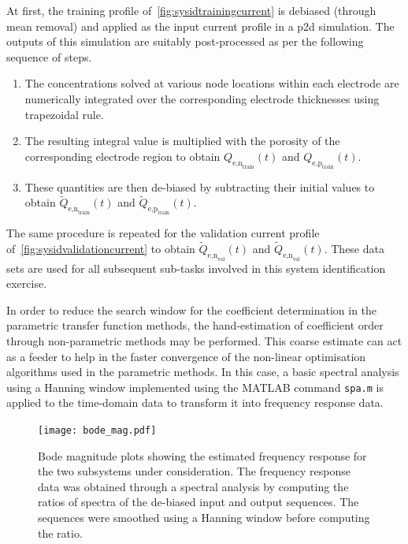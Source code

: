 At first, the training profile of~\cref{fig:sysidtrainingcurrent} is
debiased (through mean removal) and applied as the input current profile in a \gls{p2d}
simulation. The outputs of this simulation are suitably post-processed as per
the following sequence of steps.
\begin{enumerate}
    \item The concentrations solved at various node locations within each
        electrode are numerically integrated over the corresponding electrode
        thicknesses using trapezoidal rule.
    \item The resulting integral value is multiplied with the porosity of the
        corresponding electrode region to obtain $Q_{\text{e,n}_\text{train}}(t)$ and
        $Q_{\text{e,p}_\text{train}}(t)$.
    \item These quantities are then de-biased by subtracting their initial
        values to obtain $\widetilde{Q}_{\text{e,n}_\text{train}}(t)$ and
        $\widetilde{Q}_{\text{e,p}_\text{train}}(t)$.
\end{enumerate}

The        same        procedure        is        repeated        for        the
validation       current      profile       of~\cref{fig:sysidvalidationcurrent}
to         obtain         $\widetilde{Q}_{\text{e,n}_\text{val}}(t)$         and
$\widetilde{Q}_{\text{e,n}_\text{val}}(t)$.  These data  sets are  used for  all
subsequent sub-tasks involved in this system identification exercise.

In  order to  reduce  the search  window for  the  coefficient determination  in
the  parametric transfer  function methods,  the hand-estimation  of coefficient
order  through non-parametric  methods may  be performed.  This coarse  estimate
can  act as  a  feeder to  help  in  the faster  convergence  of the  non-linear
optimisation algorithms  used in the parametric  methods. In this case,  a basic
spectral analysis  using a Hanning  window implemented using the  MATLAB command
\texttt{spa.m} is applied to the time-domain data to transform it into frequency
response data.

\begin{figure}[!htbp]
    \centering
    \texttt{[image: bode\_mag.pdf]}
    \caption[Bode magnitude plots of the electrolyte time-evolution sub-systems]{%
        Bode magnitude  plots showing the  estimated frequency response  for the
        two  subsystems under  consideration.  The frequency  response data  was
        obtained  through a spectral  analysis \ie{}  by computing  the ratios  of
        spectra of the de-biased input  and output sequences. The sequences were
        smoothed using a Hanning window before computing the ratio.
    }%
    \label{fig:initialbodemag}
\end{figure}

